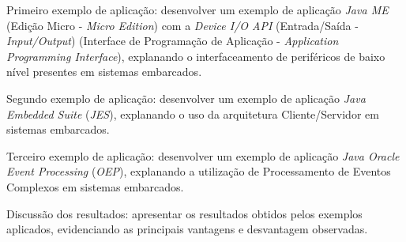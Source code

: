 Primeiro exemplo de aplicação: desenvolver um exemplo de aplicação \textit{Java
  ME} (Edição Micro - \textit{Micro Edition}) com a \textit{Device I/O API}
(Entrada/Saída - \textit{Input/Output}) (Interface de Programação de Aplicação
- \textit{Application Programming Interface}), explanando o interfaceamento de
periféricos de baixo nível presentes em sistemas embarcados.

Segundo exemplo de aplicação: desenvolver um exemplo de aplicação \textit{Java
  Embedded Suite} (\textit{JES}), explanando o uso da arquitetura
Cliente/Servidor em sistemas embarcados.

Terceiro exemplo de aplicação: desenvolver um exemplo de aplicação \textit{Java
  Oracle Event Processing} (\textit{OEP}), explanando a utilização de
Processamento de Eventos Complexos em sistemas embarcados.

Discussão dos resultados: apresentar os resultados obtidos pelos exemplos
aplicados, evidenciando as principais vantagens e desvantagem observadas.
